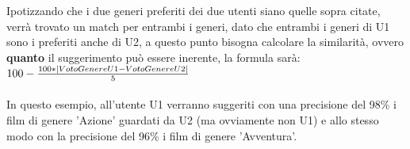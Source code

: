 \documentclass[12pt]{article}
\begin{document}
	\noindent Ipotizzando che i due generi preferiti dei due utenti siano quelle sopra citate, verrà trovato un match per entrambi i generi, dato che entrambi i generi di U1 sono i preferiti anche di U2, a questo punto bisogna calcolare la similarità, ovvero \textbf{quanto} il suggerimento può essere inerente, la formula sarà: \\
	
	$100 - {100 * |VotoGenereU1-VotoGenereU2| \over 5}$ \\ \\
	
	\noindent In questo esempio, all'utente U1 verranno suggeriti con una precisione del 98\% i film di genere 'Azione' guardati da U2 (ma ovviamente non U1) e allo stesso modo con la precisione del 96\% i film di genere 'Avventura'.
	
	
	
	
	
	
	
\end{document}
